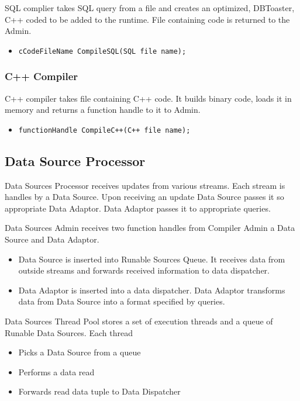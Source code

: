 \documentclass[14pt]{article}
\begin{document}
SQL complier takes SQL query from a file and creates an optimized, DBToaster, C++ coded to be added to the runtime. File containing code is returned to the Admin.

\begin{itemize}
	\item {\tt cCodeFileName CompileSQL(SQL file name);}
\end{itemize}

\subsubsection{C++ Compiler}

C++ compiler takes file containing C++ code. It builds binary code, loads it in memory and returns a function handle to it to Admin.

\begin{itemize}
	\item {\tt functionHandle CompileC++(C++ file name);}
\end{itemize}



\subsection{Data Source Processor}

\noindent Data Sources Processor receives updates from various streams. Each stream is handles by a Data Source. Upon receiving an update Data Source passes it so appropriate Data Adaptor. Data Adaptor passes it to appropriate queries. 

Data Sources Admin receives two function handles from Compiler Admin a Data Source and Data Adaptor. 

\begin{itemize}
\item Data Source is inserted into Runable Sources Queue. It receives data from outside streams and forwards received information to data dispatcher.
\item Data Adaptor is inserted into a data dispatcher. Data Adaptor transforms data from Data Source into a format specified by queries.
\end{itemize}

Data Sources Thread Pool stores a set of execution threads and a queue of Runable Data Sources. Each thread 

\begin{itemize}
	\item Picks a Data Source from a queue
	\item Performs a data read 
	\item Forwards read data tuple to Data Dispatcher
\end{itemize}
\end{document}
